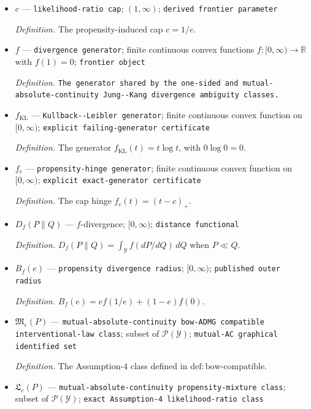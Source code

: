 \documentclass{article}
\begin{document}
\begin{itemize}
  \item \(c\) --- \texttt{likelihood-\allowbreak{}ratio cap}; \((1,\infty)\); \texttt{derived frontier parameter}
  \par\smallskip\noindent\emph{Definition.} The propensity-induced cap \(c=1/e\).
  \item \(f\) --- \texttt{divergence generator}; finite continuous convex functions \(f:[0,\infty)\to\mathbb R\) with \(f(1)=0\); \texttt{frontier object}
  \par\smallskip\noindent\emph{Definition.} \texttt{The generator shared by the one-\allowbreak{}sided and mutual-\allowbreak{}absolute-\allowbreak{}continuity Jung-\allowbreak{}-\allowbreak{}Kang divergence ambiguity classes.}
  \item \(f_{\mathrm{KL}}\) --- \texttt{Kullback-\allowbreak{}-\allowbreak{}Leibler generator}; finite continuous convex function on \([0,\infty)\); \texttt{explicit failing-\allowbreak{}generator certificate}
  \par\smallskip\noindent\emph{Definition.} The generator \(f_{\mathrm{KL}}(t)=t\log t\), with \(0\log 0=0\).
  \item \(f_c\) --- \texttt{propensity-\allowbreak{}hinge generator}; finite continuous convex function on \([0,\infty)\); \texttt{explicit exact-\allowbreak{}generator certificate}
  \par\smallskip\noindent\emph{Definition.} The cap hinge \(f_c(t)=(t-c)_+\).
  \item \(D_f(P\|Q)\) --- \(f\)-divergence; \([0,\infty)\); \texttt{distance functional}
  \par\smallskip\noindent\emph{Definition.} \(D_f(P\|Q)=\int_{\mathcal Y}f(dP/dQ)\,dQ\) when \(P\ll Q\).
  \item \(B_f(e)\) --- \texttt{propensity divergence radius}; \([0,\infty)\); \texttt{published outer radius}
  \par\smallskip\noindent\emph{Definition.} \(B_f(e)=e f(1/e)+(1-e)f(0)\).
  \item \(\mathfrak M_e(P)\) --- \texttt{mutual-\allowbreak{}absolute-\allowbreak{}continuity bow-\allowbreak{}ADMG compatible interventional-\allowbreak{}law class}; subset of \(\mathcal P(\mathcal Y)\); \texttt{mutual-\allowbreak{}AC graphical identified set}
  \par\smallskip\noindent\emph{Definition.} The Assumption-4 class defined in \(\mathrm{def:bow\text{-}compatible}\).
  \item \(\mathfrak L_e(P)\) --- \texttt{mutual-\allowbreak{}absolute-\allowbreak{}continuity propensity-\allowbreak{}mixture class}; subset of \(\mathcal P(\mathcal Y)\); \texttt{exact Assumption-\allowbreak{}4 likelihood-\allowbreak{}ratio class}

\end{itemize}
\end{document}

